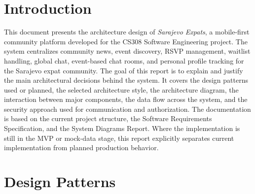 \documentclass[12pt,a4paper]{article}
\begin{document}
\section{Introduction}
This document presents the architecture design of \textit{Sarajevo Expats}, a mobile-first
community platform developed for the CS308 Software Engineering project. The system
centralizes community news, event discovery, RSVP management, waitlist handling, global
chat, event-based chat rooms, and personal profile tracking for the Sarajevo expat
community.
The goal of this report is to explain and justify the main architectural decisions behind
the system. It covers the design patterns used or planned, the selected architecture style,
the architecture diagram, the interaction between major components, the data flow across
the system, and the security approach used for communication and authorization.
The documentation is based on the current project structure, the Software Requirements
Specification, and the System Diagrams Report. Where the implementation is still in the
MVP or mock-data stage, this report explicitly separates current implementation from
planned production behavior.
\section{Design Patterns}
\end{document}
